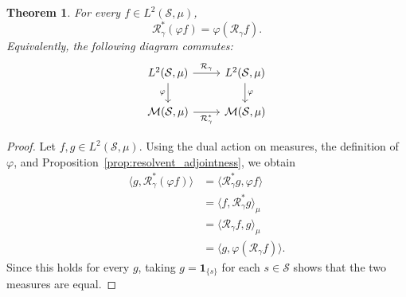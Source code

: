 \documentclass[10pt,a4paper]{amsart}
\newtheorem{theorem}{Theorem}
\renewcommand{\S}{\mathcal{S}}
\begin{document}
\begin{theorem}
\label{thm:resolvent_conjugacy}
For every $f\in L^2(\S,\mu)$,
\[
\mathcal R_\gamma^*(\varphi f)
=
\varphi(\mathcal R_\gamma f).
\]
Equivalently, the following diagram commutes:
\[
\begin{tikzcd}
L^2(\S,\mu)
    \arrow[r, "\mathcal R_\gamma"]
    \arrow[d, "\varphi"']
&
L^2(\S,\mu)
    \arrow[d, "\varphi"]
\\
\mathcal M(\S,\mu)
    \arrow[r, "\mathcal R_\gamma^*"']
&
\mathcal M(\S,\mu)
\end{tikzcd}
\]
\end{theorem}

\begin{proof}
Let $f,g\in L^2(\S,\mu)$. Using the dual action on
measures, the definition of $\varphi$, and
Proposition~\ref{prop:resolvent_adjointness}, we obtain
\[
\begin{aligned}
\langle g,\mathcal R_\gamma^*(\varphi f)\rangle
&=\langle\mathcal R_\gamma^*g,\varphi f\rangle\\
&=\langle f,\mathcal R_\gamma^*g\rangle_\mu\\
&=\langle\mathcal R_\gamma f,g\rangle_\mu\\
&=\langle g,\varphi(\mathcal R_\gamma f)\rangle.
\end{aligned}
\]
Since this holds for every $g$, taking
$g=\mathbf 1_{\{s\}}$ for each $s\in\S$ shows
that the two measures are equal.
\end{proof}
\end{document}
